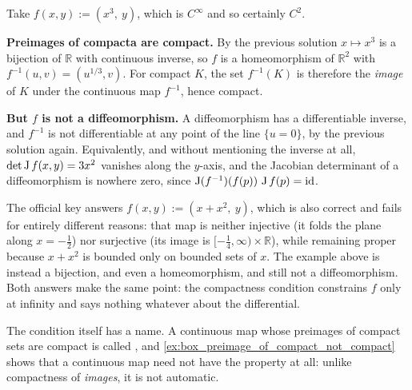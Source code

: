 \begin{exercisesolution}
\label{sol:box_proper_map_not_diffeomorphism}
Take $f(x,y) := (x^3,\ y)$, which is $C^\infty$ and so certainly $C^2$.

\textbf{Preimages of compacta are compact.} By the previous solution $x \mapsto x^3$ is a
bijection of $\mathbb{R}$ with continuous inverse, so $f$ is a homeomorphism of $\mathbb{R}^2$
with $f^{-1}(u,v) = (u^{1/3},v)$. For compact $K$, the set $f^{-1}(K)$ is therefore the
\emph{image} of $K$ under the continuous map $f^{-1}$, hence compact.

\textbf{But $f$ is not a diffeomorphism.} A diffeomorphism has a differentiable inverse, and
$f^{-1}$ is not differentiable at any point of the line $\{u = 0\}$, by the previous solution
again. Equivalently, and without mentioning the inverse at all,
$\det\operatorname{J} f(x,y) = 3x^2$ vanishes along the $y$-axis, and the Jacobian determinant of a
diffeomorphism is nowhere zero, since $\operatorname{J}(f^{-1})(f(p))\,\operatorname{J} f(p) = \operatorname{id}$.

\begin{remark}
The official key answers $f(x,y) := (x+x^2,\ y)$, which is also correct and fails for entirely
different reasons: that map is neither injective (it folds the plane along $x = -\tfrac12$) nor
surjective (its image is $[-\tfrac14,\infty)\times\mathbb{R}$), while remaining proper because
$x + x^2$ is bounded only on bounded sets of $x$. The example above is instead a bijection, and
even a homeomorphism, and still not a diffeomorphism. Both answers make the same point: the
compactness condition constrains $f$ only at infinity and says nothing whatever about the
differential.

The condition itself has a name. A continuous map whose preimages of compact sets are compact is
called , and \cref{ex:box_preimage_of_compact_not_compact} shows that a
continuous map need not have the property at all: unlike compactness of \emph{images}, it is not
automatic.
\end{remark}
\end{exercisesolution}

